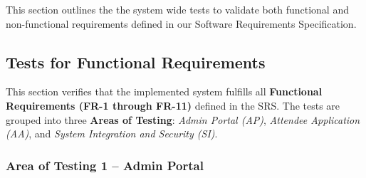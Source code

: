 \documentclass[12pt, titlepage]{article}
\begin{document}
This section outlines the the system wide tests to validate both functional and non-functional requirements defined in our Software Requirements Specification.

\subsection{Tests for Functional Requirements}

This section verifies that the implemented system fulfills all \textbf{Functional Requirements (FR-1 through FR-11)} defined in the SRS. 
The tests are grouped into three \textbf{Areas of Testing}: \textit{Admin Portal (AP)}, \textit{Attendee Application (AA)}, and \textit{System Integration and Security (SI)}. 
\subsubsection{Area of Testing 1 – Admin Portal}
\end{document}
